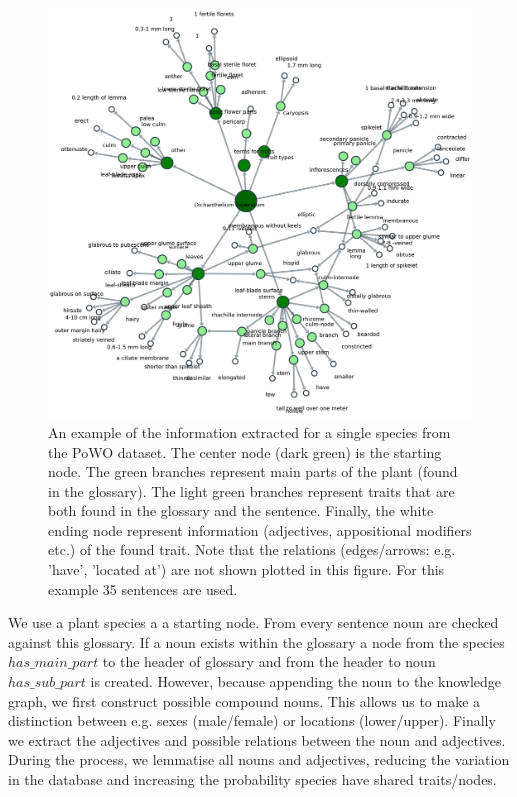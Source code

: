 \documentclass[a4paper, 12pt, oneside]{book} %
\begin{document}
\begin{figure} [htpb]
    \centering
    \includegraphics[width=\textwidth]{figures/kngraph.pdf}
    \caption[Example of automatic information extraction]{An example of the information extracted for a single species from the PoWO dataset. The center node (dark green) is the starting node. The green branches represent main parts of the plant (found in the glossary). The light green branches represent traits that are both found in the glossary and the sentence. Finally, the white ending node represent information (adjectives, appositional modifiers etc.) of the found trait. Note that the relations (edges/arrows: e.g. 'have', 'located at') are not shown plotted in this figure. For this example 35 sentences are used.}
    \label{fig:kngraph}
\end{figure}

We use a plant species a a starting node.
From every sentence noun are checked against this glossary.
If a noun exists within the glossary a node from the species $has\_main\_part$ to the header of glossary and from the header to noun $has\_sub\_part$ is created.
However, because appending the noun to the knowledge graph, we first construct possible compound nouns.
This allows us to make a distinction between e.g. sexes (male/female) or locations (lower/upper).
Finally we extract the adjectives and possible relations between the noun and adjectives.
During the process, we lemmatise all nouns and adjectives, reducing the variation in the database and increasing the probability species have shared traits/nodes.
\end{document}
